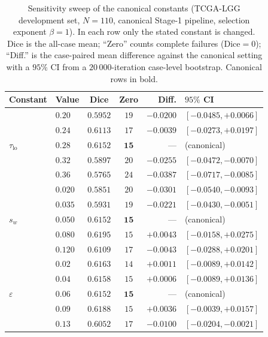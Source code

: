 \documentclass[11pt,a4paper]{article}
\begin{document}
\begin{table}[htpb!]\centering
\caption{Sensitivity sweep of the canonical constants (TCGA-LGG development set,
$N{=}110$, canonical Stage-1 pipeline, selection exponent $\beta{=}1$). In each row
only the stated constant is changed. Dice is the all-case mean; ``Zero'' counts
complete failures (Dice$=0$); ``Diff.'' is the case-paired mean difference against
the canonical setting with a $95\%$ CI from a $20\,000$-iteration case-level
bootstrap. Canonical rows in bold.}
\label{tab:constant-sensitivity}
\begin{tabular}{llccr@{\;}l}
\toprule
Constant & Value & Dice & Zero & Diff. & $95\%$ CI \\
\midrule
\multirow{5}{*}{$\tau_{\text{lo}}$}
 & $0.20$ & $0.5952$ & $19$ & $-0.0200$ & $[-0.0485,+0.0066]$ \\
 & $0.24$ & $0.6113$ & $17$ & $-0.0039$ & $[-0.0273,+0.0197]$ \\
 & $\mathbf{0.28}$ & $\mathbf{0.6152}$ & $\mathbf{15}$ & --- & (canonical) \\
 & $0.32$ & $0.5897$ & $20$ & $-0.0255$ & $[-0.0472,-0.0070]$ \\
 & $0.36$ & $0.5765$ & $24$ & $-0.0387$ & $[-0.0717,-0.0085]$ \\
\midrule
\multirow{5}{*}{$s_w$}
 & $0.020$ & $0.5851$ & $20$ & $-0.0301$ & $[-0.0540,-0.0093]$ \\
 & $0.035$ & $0.5931$ & $19$ & $-0.0221$ & $[-0.0430,-0.0051]$ \\
 & $\mathbf{0.050}$ & $\mathbf{0.6152}$ & $\mathbf{15}$ & --- & (canonical) \\
 & $0.080$ & $0.6195$ & $15$ & $+0.0043$ & $[-0.0158,+0.0275]$ \\
 & $0.120$ & $0.6109$ & $17$ & $-0.0043$ & $[-0.0288,+0.0201]$ \\
\midrule
\multirow{5}{*}{$\varepsilon$}
 & $0.02$ & $0.6163$ & $14$ & $+0.0011$ & $[-0.0089,+0.0142]$ \\
 & $0.04$ & $0.6158$ & $15$ & $+0.0006$ & $[-0.0089,+0.0136]$ \\
 & $\mathbf{0.06}$ & $\mathbf{0.6152}$ & $\mathbf{15}$ & --- & (canonical) \\
 & $0.09$ & $0.6188$ & $15$ & $+0.0036$ & $[-0.0039,+0.0157]$ \\
 & $0.13$ & $0.6052$ & $17$ & $-0.0100$ & $[-0.0204,-0.0021]$ \\
\bottomrule
\end{tabular}
\end{table}
\end{document}
